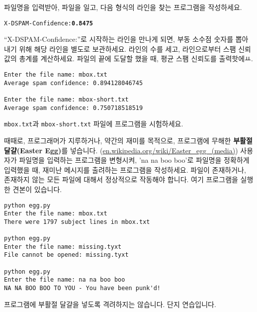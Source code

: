 \begin{ex}

파일명을 입력받아, 파일을 일고, 다음 형식의 라인을 찾는 프로그램을 작성하세요.

\beforeverb
\begin{alltt}
X-DSPAM-Confidence: {\bf 0.8475}
\end{alltt}
\afterverb

``X-DSPAM-Confidence:''로 시작하는 라인을 만나게 되면, 부동 소수점 숫자를 뽑아내기 위해 해당 라인을 별도로 보관하세요.
라인의 수를 세고, 라인으로부터 스팸 신뢰값의 총계를 계산하세요. 파일의 끝에 도달할 했을 때, 평균 스팸 신뢰도를 출력핫에ㅛ.

\beforeverb
\begin{verbatim}
Enter the file name: mbox.txt
Average spam confidence: 0.894128046745

Enter the file name: mbox-short.txt
Average spam confidence: 0.750718518519
\end{verbatim}
\afterverb
%
{\tt mbox.txt}과 {\tt mbox-short.txt} 파일에 프로그램을 시험하세요.
\end{ex}


\begin{ex}

때때로, 프로그래머가 지루하거나, 약간의 재미를 목적으로, 프로그램에 무해한 {\bf 부활절 달걀(Easter Egg)}를 넣습니다.
(\url{en.wikipedia.org/wiki/Easter_egg_(media)})
사용자가 파일명을 입력하는 프로그램을 변형시켜, 'na na boo boo'로 파일명을 정확하게 입력했을 때, 재미난 메시지를 출려하는 프로그램을 작성하세요.
파일이 존재하거나, 존재하지 않는 모든 파일에 대해서 정상적으로 작동해야 합니다. 여기 프로그램을 실행한 견본이 있습니다.

\beforeverb
\begin{verbatim}
python egg.py 
Enter the file name: mbox.txt
There were 1797 subject lines in mbox.txt

python egg.py 
Enter the file name: missing.tyxt
File cannot be opened: missing.tyxt

python egg.py 
Enter the file name: na na boo boo
NA NA BOO BOO TO YOU - You have been punk'd!
\end{verbatim}
\afterverb
%

프로그램에 부활절 달걀을 넣도록 격려하지는 않습니다. 단지 연습입니다.

\end{ex}

